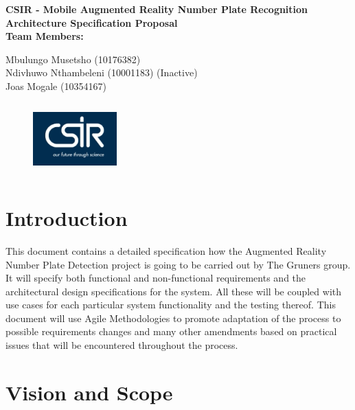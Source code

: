 \documentclass[12pt]{article}
\newcommand{\Title}{CSIR - Mobile Augmented Reality Number Plate Recognition} %
\begin{document}
        \vspace{4em}
        
        \begin{center}%
        
          \LARGE \bf \Title \\[4em]
          \LARGE {\bf Architecture Specification Proposal}\\[1em]
          \LARGE {\bf Team Members:}\\[2em]
          \large
          
             Mbulungo Musetsho                          (10176382)  \\[1em]
             Ndivhuwo Nthambeleni 						(10001183) (Inactive)	\\[1em]
             Joas Mogale 								(10354167)	\\[1em]
            
        \end{center}%
        \begin{figure}[h]
	           \centering
	           \includegraphics[width=1.27in, height=1.09in]{Pictures/csir.png}
	   	\end{figure}
	    \FloatBarrier
        

        \newpage
        \tableofcontents    
                \newpage
                \section{Introduction}
                		This document contains a detailed specification how the Augmented Reality Number Plate Detection project is going to be carried out by The Gruners group. It will specify both functional and non-functional requirements and the architectural design specifications for the system. All these will be coupled with use cases for each particular system functionality and the testing thereof. This document will use Agile Methodologies to promote adaptation of the process to possible requirements changes and many other amendments based on practical issues that will be encountered throughout the process. 
                \section{Vision and Scope}
\end{document}
